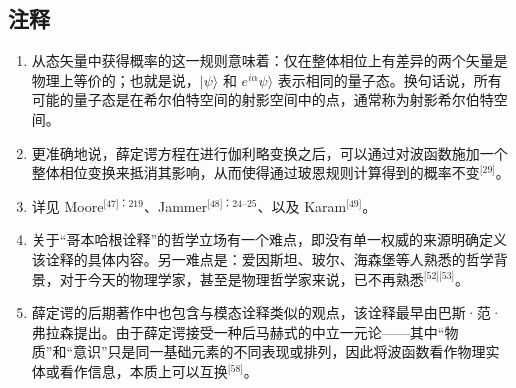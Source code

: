 \subsection{注释}
\begin{enumerate}
\item 从态矢量中获得概率的这一规则意味着：仅在整体相位上有差异的两个矢量是物理上等价的；也就是说，$|\psi\rangle$ 和 $e^{i\alpha}\psi\rangle$ 表示相同的量子态。换句话说，所有可能的量子态是在希尔伯特空间的射影空间中的点，通常称为射影希尔伯特空间。
\item 更准确地说，薛定谔方程在进行伽利略变换之后，可以通过对波函数施加一个整体相位变换来抵消其影响，从而使得通过玻恩规则计算得到的概率不变\(^\text{[29]}\)。
\item 详见 Moore\(^\text{[47]：219}\)、Jammer\(^\text{[48]：24–25}\)、以及 Karam\(^\text{[49]}\)。
\item 关于“哥本哈根诠释”的哲学立场有一个难点，即没有单一权威的来源明确定义该诠释的具体内容。另一难点是：爱因斯坦、玻尔、海森堡等人熟悉的哲学背景，对于今天的物理学家，甚至是物理哲学家来说，已不再熟悉\(^\text{[52][53]}\)。
\item 薛定谔的后期著作中也包含与模态诠释类似的观点，该诠释最早由巴斯·范·弗拉森提出。由于薛定谔接受一种后马赫式的中立一元论——其中“物质”和“意识”只是同一基础元素的不同表现或排列，因此将波函数看作物理实体或看作信息，本质上可以互换\(^\text{[58]}\)。
\end{enumerate}
